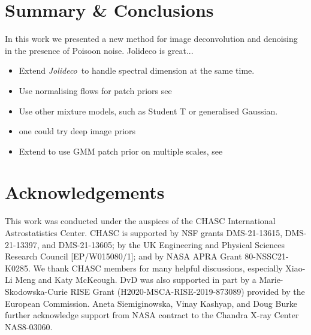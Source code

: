 \documentclass[twocolumn]{aastex631}
\newcommand{\jolideco}{\textit{Jolideco}~}
\begin{document}
    \section{Summary \& Conclusions}
    In this work we presented a new method for image deconvolution and denoising in the presence of Poisoon noise.
    Jolideco is great...

    \begin{itemize}
        \item Extend \jolideco to handle spectral dimension at the same time.
        \item Use normalising flows for patch priors see \cite{Altekrueger2022}
        \item Use other mixture models, such as Student T or generalised Gaussian. 
        \item one could try deep image priors \citep{Ulyanov2017}
        \item Extend to use GMM patch prior on multiple scales, see \cite{Papyan2015}
    \end{itemize}
    

    \section*{Acknowledgements}
    This work was conducted under the auspices of the CHASC International Astrostatistics Center.
    CHASC is supported by NSF grants DMS-21-13615, DMS-21-13397, and DMS-21-13605; by the UK Engineering
    and Physical Sciences Research Council [EP/W015080/1]; and by NASA APRA Grant 80-NSSC21-K0285.
    We thank CHASC members for many helpful discussions, especially Xiao-Li Meng and Katy McKeough.
    DvD was also supported in part by a Marie-Skodowska-Curie RISE Grant (H2020-MSCA-RISE-2019-873089)
    provided by the European Commission.
    Aneta Siemiginowska, Vinay Kashyap, and Doug Burke further acknowledge support from NASA
    contract to the Chandra X-ray Center NAS8-03060.

    \newpage
    
\end{document}
